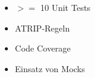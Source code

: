 \begin{itemize}
	\item $>=$ 10 Unit Tests
	\item ATRIP-Regeln
	\item Code Coverage
	\item Einsatz von Mocks
\end{itemize}

